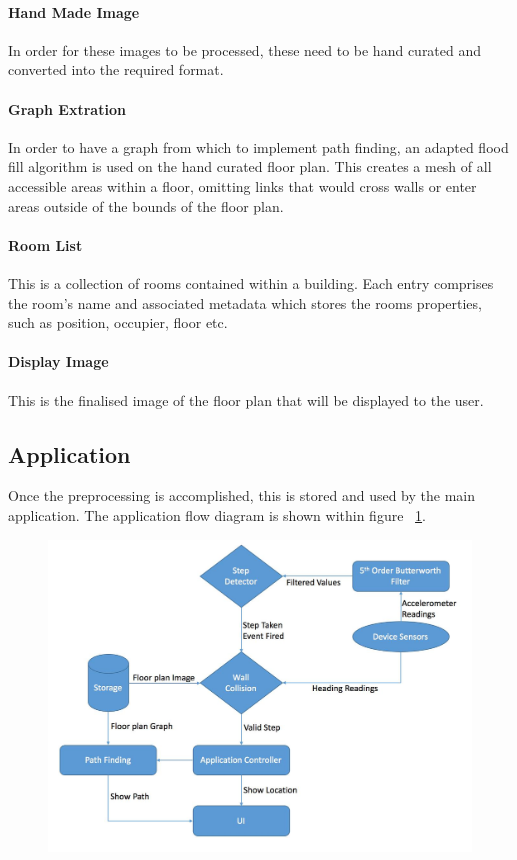 \documentclass[12pt,a4paper]{report}
\begin{document}
\paragraph{Hand Made Image}
In order for these images to be processed, these need to be hand curated and converted into the required format.

\paragraph{Graph Extration}
In order to have a graph from which to implement path finding, an adapted flood fill algorithm is used on the hand curated floor plan. This creates a mesh of all accessible areas within a floor, omitting links that would cross walls or enter areas outside of the bounds of the floor plan.

\paragraph{Room List}
This is a collection of rooms contained within a building. Each entry comprises the room's name and associated metadata which stores the rooms properties, such as position, occupier, floor etc.

\paragraph{Display Image}
This is the finalised image of the floor plan that will be displayed to the user.

\subsection{Application}
Once the preprocessing is accomplished, this is stored and used by the main application. The application flow diagram is shown within figure ~\ref{fig:appFlow}.

\begin{figure}[h]
\includegraphics[width=\textwidth]{images/appFlow.png}
\label{fig:appFlow}
\end{figure}
\end{document}
